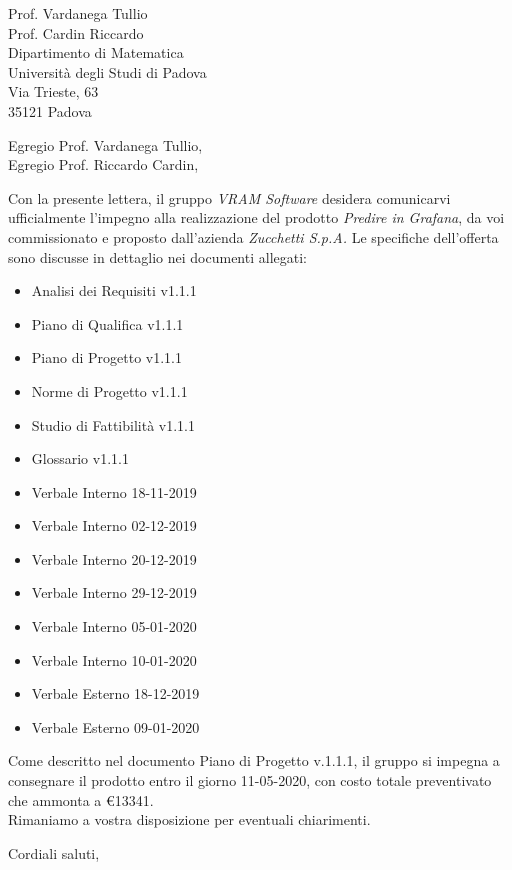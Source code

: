 \documentclass[a4paper,12pt]{letteracdp}
\date{14 gennaio 2020}
\begin{document}
\begin{letter}{
		Prof. Vardanega Tullio \\
		Prof. Cardin Riccardo \\
		Dipartimento di Matematica \\
		Università degli Studi di Padova \\
		Via Trieste, 63 \\
		35121 Padova}
	
	\opening{Egregio Prof. Vardanega Tullio, \\ \noindent Egregio Prof. Riccardo Cardin,}
	
	\begin{flushleft}
	Con la presente lettera, il gruppo \textit{VRAM Software} desidera comunicarvi ufficialmente l'impegno alla realizzazione del prodotto \textit{Predire in Grafana}, da voi commissionato e proposto dall'azienda \textit{Zucchetti S.p.A.}
	Le specifiche dell'offerta sono discusse in dettaglio nei documenti allegati:
	\end{flushleft}

	\begin{itemize}
		\item Analisi dei Requisiti v1.1.1
		\item Piano di Qualifica v1.1.1
		\item Piano di Progetto v1.1.1
		\item Norme di Progetto v1.1.1
		\item Studio di Fattibilità v1.1.1
		\item Glossario v1.1.1
		\item Verbale Interno 18-11-2019
		\item Verbale Interno 02-12-2019
		\item Verbale Interno 20-12-2019
		\item Verbale Interno 29-12-2019
		\item Verbale Interno 05-01-2020
		\item Verbale Interno 10-01-2020
		\item Verbale Esterno 18-12-2019
		\item Verbale Esterno 09-01-2020
	\end{itemize}

	\begin{flushleft}
	\noindent Come descritto nel documento Piano di Progetto v.1.1.1, il gruppo si impegna a consegnare il prodotto entro il giorno 11-05-2020, con costo totale preventivato che ammonta a \euro{13341}.
	\\
	
	Rimaniamo a vostra disposizione per eventuali chiarimenti.
	\end{flushleft}

	\closing{Cordiali saluti,}
	
\end{letter}	
\end{document}
